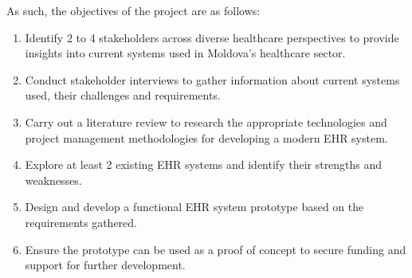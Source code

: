 As such, the objectives of the project are as follows:
\begin{enumerate}   
    \item Identify 2 to 4 stakeholders across diverse healthcare perspectives to provide insights into current systems used in Moldova's healthcare sector.
    \item Conduct stakeholder interviews to gather information about current systems used, their challenges and requirements.
    \item Carry out a literature review to research the appropriate technologies and project management methodologies for developing a modern EHR system.
    \item Explore at least 2 existing EHR systems and identify their strengths and weaknesses.
    \item Design and develop a functional EHR system prototype based on the requirements gathered.
    \item Ensure the prototype can be used as a proof of concept to secure funding and support for further development.
\end{enumerate}